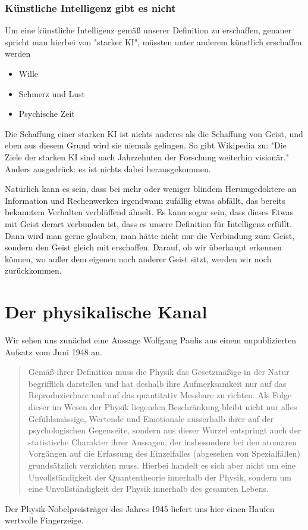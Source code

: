 \documentclass[12pt]{book}
\begin{document}
\subsection{Künstliche Intelligenz gibt es nicht}

Um eine künstliche Intelligenz gemäß unserer Definition zu erschaffen, genauer spricht man hierbei von "starker KI", müssten unter anderem künstlich erschaffen werden

\begin{itemize}
\item Wille
\item Schmerz und Lust
\item Psychische Zeit
\end{itemize}

Die Schaffung einer starken KI ist nichts anderes als die Schaffung von Geist, und eben aus diesem Grund wird sie niemals gelingen. So gibt Wikipedia zu:
"Die Ziele der starken KI sind nach Jahrzehnten der Forschung weiterhin visionär." Anders ausgedrück: es ist nichts dabei herausgekommen.

Natürlich kann es sein, dass bei mehr oder weniger blindem Herumgedoktere an Information und Rechenwerken irgendwann zufällig etwas abfällt, das bereits bekanntem Verhalten verblüffend ähnelt. Es kann sogar sein, dass dieses Etwas mit Geist derart verbunden ist, dass es unsere Definition für Intelligenz erfüllt. Dann wird man gerne glauben, man hätte nicht nur die Verbindung zum Geist, sondern den Geist gleich mit erschaffen. Darauf, ob wir überhaupt erkennen können, wo außer dem eigenen noch anderer Geist sitzt, werden wir noch zurückkommen.


\chapter{Der physikalische Kanal}
Wir sehen uns zunächst eine Aussage Wolfgang Paulis aus einem unpublizierten Aufsatz vom Juni 1948 an.
\begin{quote}\begin{tcolorbox}
Gemäß ihrer Definition muss die Physik das Gesetzmäßige in der Natur begrifflich darstellen und hat deshalb ihre Aufmerksamkeit nur auf das Reproduzierbare und auf das quantitativ Messbare zu richten. Als Folge dieser im Wesen der Physik liegenden Beschränkung bleibt nicht nur alles Gefühlsmässige, Wertende und Emotionale ausserhalb ihrer auf der psychologischen Gegenseite, sondern aus dieser Wurzel entspringt auch der statistische Charakter ihrer Aussagen, der insbesondere bei den atomaren Vorgängen auf die Erfassung des Einzelfalles (abgesehen von Spezialfällen) grundsätzlich verzichten muss. Hierbei handelt es sich aber nicht um eine Unvollständigkeit der Quantentheorie innerhalb der Physik, sondern um eine Unvollständigkeit der Physik innerhalb des gesamten Lebens.
\end{tcolorbox}\end{quote}
Der Physik-Nobelpreisträger des Jahres 1945 liefert uns hier einen Haufen wertvolle Fingerzeige.
\end{document}
